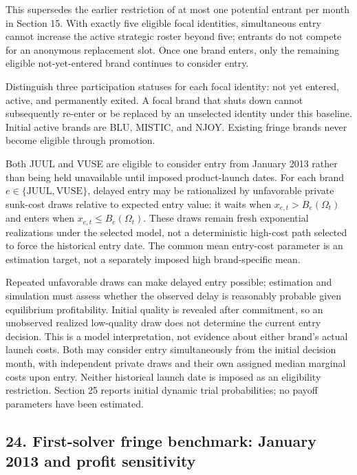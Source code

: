 \documentclass[10pt,]{article}
\begin{document}
This supersedes the earlier restriction of at most one potential entrant
per month in Section 15. With exactly five eligible focal identities,
simultaneous entry cannot increase the active strategic roster beyond
five; entrants do not compete for an anonymous replacement slot. Once
one brand enters, only the remaining eligible not-yet-entered brand
continues to consider entry.

Distinguish three participation statuses for each focal identity: not
yet entered, active, and permanently exited. A focal brand that shuts
down cannot subsequently re-enter or be replaced by an unselected
identity under this baseline. Initial active brands are BLU, MISTIC, and
NJOY. Existing fringe brands never become eligible through promotion.

Both JUUL and VUSE are eligible to consider entry from January 2013
rather than being held unavailable until imposed product-launch dates.
For each brand \(e\in\{\mathrm{JUUL},\mathrm{VUSE}\}\), delayed entry
may be rationalized by unfavorable private sunk-cost draws relative to
expected entry value: it waits when \(x_{e,t}>B_e(\Omega_t)\) and enters
when \(x_{e,t}\leq B_e(\Omega_t)\). These draws remain fresh exponential
realizations under the selected model, not a deterministic high-cost
path selected to force the historical entry date. The common mean
entry-cost parameter is an estimation target, not a separately imposed
high brand-specific mean.

Repeated unfavorable draws can make delayed entry possible; estimation
and simulation must assess whether the observed delay is reasonably
probable given equilibrium profitability. Initial quality is revealed
after commitment, so an unobserved realized low-quality draw does not
determine the current entry decision. This is a model interpretation,
not evidence about either brand's actual launch costs. Both may consider
entry simultaneously from the initial decision month, with independent
private draws and their own assigned median marginal costs upon entry.
Neither historical launch date is imposed as an eligibility restriction.
Section 25 reports initial dynamic trial probabilities; no payoff
parameters have been estimated.

\subsection{24. First-solver fringe benchmark: January 2013 and profit
sensitivity}\label{first-solver-fringe-benchmark-january-2013-and-profit-sensitivity}
\end{document}
